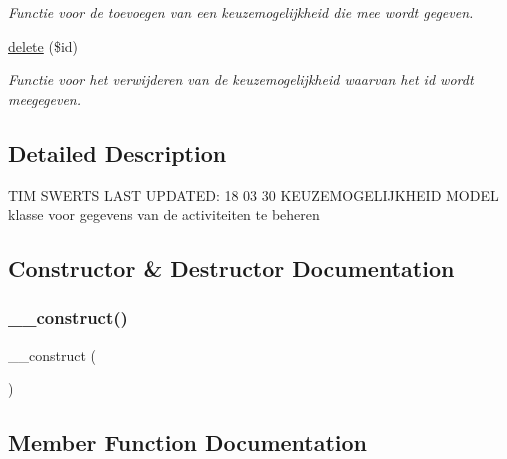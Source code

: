 \begin{DoxyCompactItemize}
\begin{DoxyCompactList}\small\item\em Functie voor de toevoegen van een keuzemogelijkheid die mee wordt gegeven. \end{DoxyCompactList}\item 
\mbox{\hyperlink{class_keuzemogelijkheid___model_a2f8258add505482d7f00ea26493a5723}{delete}} (\$id)
\begin{DoxyCompactList}\small\item\em Functie voor het verwijderen van de keuzemogelijkheid waarvan het id wordt meegegeven. \end{DoxyCompactList}\end{DoxyCompactItemize}


\subsection{Detailed Description}
T\+IM S\+W\+E\+R\+TS L\+A\+ST U\+P\+D\+A\+T\+ED\+: 18 03 30 K\+E\+U\+Z\+E\+M\+O\+G\+E\+L\+I\+J\+K\+H\+E\+ID M\+O\+D\+EL klasse voor gegevens van de activiteiten te beheren 

\subsection{Constructor \& Destructor Documentation}
\mbox{\label{class_keuzemogelijkheid___model_a095c5d389db211932136b53f25f39685}} 
\subsubsection{\texorpdfstring{\+\_\+\+\_\+construct()}{\_\_construct()}}
{\footnotesize\ttfamily \+\_\+\+\_\+construct (\begin{DoxyParamCaption}{ }\end{DoxyParamCaption})}



\subsection{Member Function Documentation}
\mbox{\label{class_keuzemogelijkheid___model_ab3ea46c3ea11cbb463eb98238e38c580}} 
